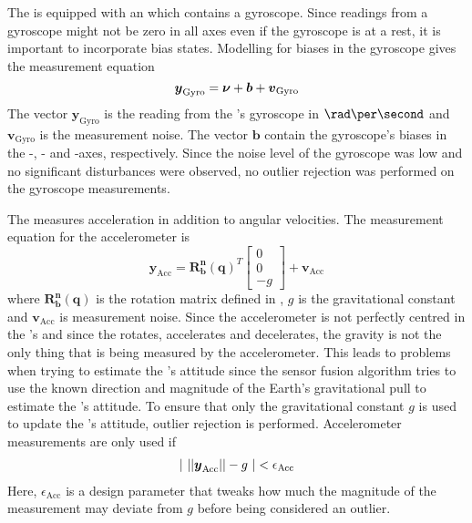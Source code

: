 The \abbrROV is equipped with an \abbrIMU which contains a gyroscope. Since readings from a gyroscope might not be zero in all axes even if the gyroscope is at a rest, it is important to incorporate bias states. Modelling for biases in the gyroscope gives the measurement equation
\begin{equation}\label{eq:gyro}
\boldsymbol{y}_\text{Gyro}= \boldsymbol{\nu} + \boldsymbol{b} + \boldsymbol{v}_{\text{Gyro}}
\end{equation}
 The vector $\boldsymbol{y}_\text{Gyro}$ is the reading from the \abbrIMU's gyroscope in $\rad\per\second$ and $\boldsymbol{v}_{\text{Gyro}}$ is the measurement noise. The vector $\boldsymbol{b}$ contain the gyroscope's biases in the \xPosition-, \yPosition- and \zPosition-axes, respectively.
Since the noise level of the gyroscope was low and no significant disturbances were observed, no outlier rejection was performed on the gyroscope measurements. %

The \abbrIMU measures acceleration in addition to angular velocities. The measurement equation for the accelerometer is
\begin{equation}
\boldsymbol{y}_{\text{Acc}} =
    \boldsymbol{R^n_b}(\boldsymbol{q})^T
    \begin{bmatrix}
    0\\
    0\\
    -g
    \end{bmatrix}
+ \boldsymbol{v}_{\text{Acc}}
\end{equation}
    where $\boldsymbol{R^n_b}(\boldsymbol{q})$ is the rotation matrix defined in , $g$ is the gravitational constant and $\boldsymbol{v}_{\text{Acc}}$ is measurement noise. Since the accelerometer is not perfectly centred in the \abbrROV's \abbrCG and since the \abbrROV rotates, accelerates and decelerates, the gravity is not the only thing that is being measured by the accelerometer. This leads to problems when trying to estimate the \abbrROV's attitude since the sensor fusion algorithm tries to use the known direction and magnitude of the Earth's gravitational pull to estimate the \abbrROV's attitude. To ensure that only the gravitational constant $g$ is used to update the \abbrROV's attitude, outlier rejection is performed. Accelerometer measurements are only used if 
\begin{align}
    |~||
    \boldsymbol{y}_{\text{Acc}}
||
    -g
     ~| < \epsilon_{\text{Acc}}
\end{align}
Here, $\epsilon_{\text{Acc}}$ is a design parameter that tweaks how much the magnitude of the measurement may deviate from $g$ before being considered an outlier.

